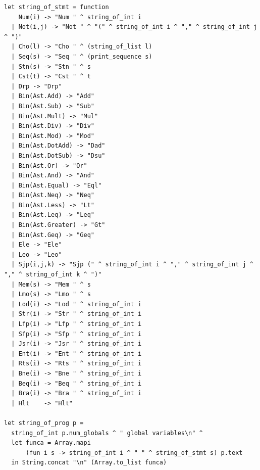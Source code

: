 \documentclass[12pt,A4]{book}
\begin{document}
\begin{verbatim}
let string_of_stmt = function
    Num(i) -> "Num " ^ string_of_int i
  | Not(i,j) -> "Not " ^ "(" ^ string_of_int i ^ "," ^ string_of_int j ^ ")"
  | Cho(l) -> "Cho " ^ (string_of_list l)
  | Seq(s) -> "Seq " ^ (print_sequence s)
  | Stn(s) -> "Stn " ^ s
  | Cst(t) -> "Cst " ^ t
  | Drp -> "Drp"
  | Bin(Ast.Add) -> "Add"
  | Bin(Ast.Sub) -> "Sub"
  | Bin(Ast.Mult) -> "Mul"
  | Bin(Ast.Div) -> "Div"
  | Bin(Ast.Mod) -> "Mod"
  | Bin(Ast.DotAdd) -> "Dad"
  | Bin(Ast.DotSub) -> "Dsu"
  | Bin(Ast.Or) -> "Or"
  | Bin(Ast.And) -> "And"
  | Bin(Ast.Equal) -> "Eql"
  | Bin(Ast.Neq) -> "Neq"
  | Bin(Ast.Less) -> "Lt"
  | Bin(Ast.Leq) -> "Leq"
  | Bin(Ast.Greater) -> "Gt"
  | Bin(Ast.Geq) -> "Geq"
  | Ele -> "Ele"
  | Leo -> "Leo"
  | Sjp(i,j,k) -> "Sjp (" ^ string_of_int i ^ "," ^ string_of_int j ^ "," ^ string_of_int k ^ ")"
  | Mem(s) -> "Mem " ^ s
  | Lmo(s) -> "Lmo " ^ s
  | Lod(i) -> "Lod " ^ string_of_int i
  | Str(i) -> "Str " ^ string_of_int i
  | Lfp(i) -> "Lfp " ^ string_of_int i
  | Sfp(i) -> "Sfp " ^ string_of_int i
  | Jsr(i) -> "Jsr " ^ string_of_int i
  | Ent(i) -> "Ent " ^ string_of_int i
  | Rts(i) -> "Rts " ^ string_of_int i
  | Bne(i) -> "Bne " ^ string_of_int i
  | Beq(i) -> "Beq " ^ string_of_int i
  | Bra(i) -> "Bra " ^ string_of_int i
  | Hlt    -> "Hlt"

let string_of_prog p =
  string_of_int p.num_globals ^ " global variables\n" ^
  let funca = Array.mapi
      (fun i s -> string_of_int i ^ " " ^ string_of_stmt s) p.text
  in String.concat "\n" (Array.to_list funca)
\end{verbatim}
\end{document}
